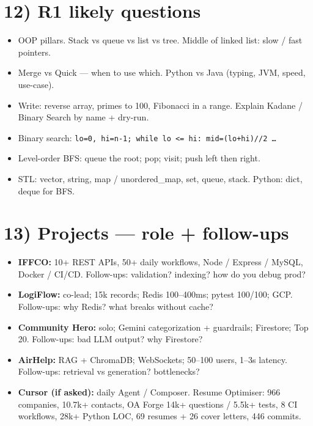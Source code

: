 \documentclass[a4paper,9pt]{extarticle}
\begin{document}
\section{12) R1 likely questions}
\begin{itemize}
  \item OOP pillars. Stack vs queue vs list vs tree. Middle of linked list: slow / fast pointers.
  \item Merge vs Quick --- when to use which. Python vs Java (typing, JVM, speed, use-case).
  \item Write: reverse array, primes to 100, Fibonacci in a range. Explain Kadane / Binary Search by name + dry-run.
  \item Binary search: \texttt{lo=0, hi=n-1; while lo <= hi: mid=(lo+hi)//2 \ldots}
  \item Level-order BFS: queue the root; pop; visit; push left then right.
  \item STL: vector, string, map / unordered\_map, set, queue, stack. Python: dict, deque for BFS.
\end{itemize}

\section{13) Projects --- role + follow-ups}
\begin{itemize}
  \item \textbf{IFFCO:} 10+ REST APIs, 50+ daily workflows, Node / Express / MySQL, Docker / CI/CD. Follow-ups: validation? indexing? how do you debug prod?
  \item \textbf{LogiFlow:} co-lead; 15k records; Redis 100--400ms; pytest 100/100; GCP. Follow-ups: why Redis? what breaks without cache?
  \item \textbf{Community Hero:} solo; Gemini categorization + guardrails; Firestore; Top 20. Follow-ups: bad LLM output? why Firestore?
  \item \textbf{AirHelp:} RAG + ChromaDB; WebSockets; 50--100 users, 1--3s latency. Follow-ups: retrieval vs generation? bottlenecks?
  \item \textbf{Cursor (if asked):} daily Agent / Composer. Resume Optimiser: 966 companies, 10.7k+ contacts, OA Forge 14k+ questions / 5.5k+ tests, 8 CI workflows, 28k+ Python LOC, 69 resumes + 26 cover letters, 446 commits.
\end{itemize}
\end{document}
